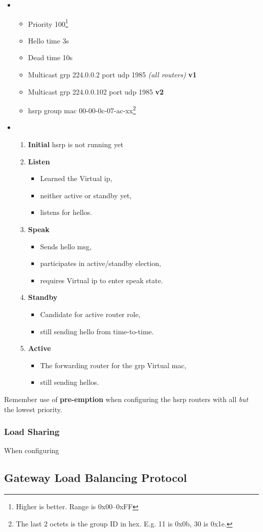 \begin{itemize}
    \item {}
    \begin{itemize}
        \item Priority 100\footnote{Higher is better. Range is 0x00--0xFF}
        \item Hello time 3s
        \item Dead time 10s
        \item Multicast grp 224.0.0.2 port udp 1985 \textit{(all routers)} {\scriptsize \textbf{v1}}
        \item Multicast grp 224.0.0.102 port udp 1985 {\scriptsize \textbf{v2}}
        \item \gls{hsrp} group mac 00-00-0c-07-ac-xx\footnote{The last 2 octets is the group ID in hex. E.g. 11 is 0x0b, 30 is 0x1e.}
    \end{itemize}
    \item {}
    \begin{enumerate}
        \item \textbf{Initial} \gls{hsrp} is not running yet
        \item \textbf{Listen}
        \begin{itemize}
            \item Learned the Virtual \gls{ip},
            \item neither active or standby yet,
            \item listens for hellos.
        \end{itemize}
        \item \textbf{Speak}
        \begin{itemize}
            \item Sends hello msg,
            \item participates in active/standby election,
            \item requires Virtual \gls{ip} to enter speak state.
        \end{itemize}
        \item \textbf{Standby}
        \begin{itemize}
            \item Candidate for active router role,
            \item still sending hello from time-to-time.
        \end{itemize}
        \item \textbf{Active}
        \begin{itemize}
            \item The forwarding router for the grp Virtual \gls{mac},
            \item still sending hellos.
        \end{itemize}
    \end{enumerate}
\end{itemize}

Remember use of \textbf{pre-emption} when configuring the \gls{hsrp} routers with all \textit{but} the lowest priority.

\subsubsection[Blncd]{Load Sharing}

When configuring 

\subsection[GLBP]{Gateway Load Balancing Protocol}
